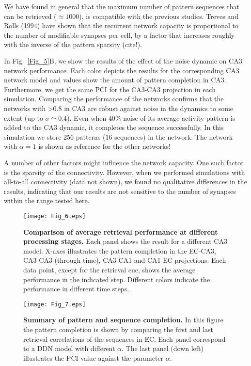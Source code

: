 \documentclass[utf8]{frontiersSCNS} %
\begin{document}
We have found in general that the maximum number of pattern sequences that can be retrieved ($\simeq 1000$), is compatible with the previous studies. Treves and Rolls (1994) have shown that the recurrent network capacity is proportional to the number of modifiable synapses per cell, by a factor that increases roughly with the inverse of the pattern sparsity (cite!). 
%

In Fig.~\ref{Fig_5}B, we show the results of the effect of the noise dynamic on CA3 network performance. Each color depicts the results for the corresponding CA3 network model and values show the amount of pattern completion in CA3.
Furthermore, we get the same PCI for the CA3-CA3 projection in each simulation.
Comparing the performance of the networks confirms that the networks with >0.8 in CA3 are robust against noise in the dynamics to some extent (up to $\sigma \simeq 0.4$). Even when $ 40 \% $ noise of its average activity pattern is added to the CA3 dynamic, it completes the sequence successfully. In this simulation we store 256 patterns (16 sequences) in the network. The network with $\alpha = 1$ is shown as reference for the other networks!    

A number of other factors might influence the network capacity. One such factor is the sparsity of the connectivity. However, when we performed simulations with all-to-all connectivity (data not shown), we found no qualitative differences in the results, indicating that our results are not sensitive to the number of synapses within the range tested here. 

\begin{figure}[!htb]
\centering\texttt{[image: Fig\_6.eps]}
\caption{\textbf{Comparison of average retrieval performance at different processing stages.}
Each panel shows the result for a different CA3 model. X-axes illustrates the pattern completion in the EC-CA3, CA3-CA3 (through time), CA3-CA1 and CA1-EC projections. Each data point, except for the retrieval cue, shows the average performance in the indicated step. Different colors indicate the performance in different time steps.}
\label{Fig_6}
\end{figure}

\begin{figure}[!htb]
\centering\texttt{[image: Fig\_7.eps]}
\caption{\textbf{Summary of pattern and sequence completion.} In this figure the pattern completion is shown by comparing the first and last retrieval correlations of the sequences in EC. Each panel correspond to a  DDN model with different $\alpha$. The last panel (down left) illustrates the PCI value against the parameter $\alpha$.}
\label{Fig_7}
\end{figure}
\end{document}
